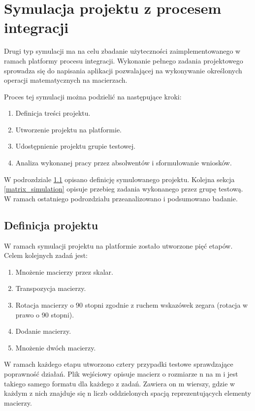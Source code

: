 \section{Symulacja projektu z procesem integracji}
\label{research_matrix}

Drugi typ symulacji ma na celu zbadanie użyteczności zaimplementowanego w ramach platformy procesu integracji.
Wykonanie pełnego zadania projektowego sprowadza się do napisania aplikacji pozwalającej na wykonywanie określonych operacji matematycznych na macierzach.

Proces tej symulacji można podzielić na następujące kroki:
\begin{enumerate}
    \item Definicja treści projektu.
    \item Utworzenie projektu na platformie.
    \item Udostępnienie projektu grupie testowej.
    \item Analiza wykonanej pracy przez absolwentów i sformułowanie wniosków.
\end{enumerate}

W podrozdziale \ref{matrix_project_definition} opisano definicję symulowanego projektu.
Kolejna sekcja \ref{matrix_simulation} opisuje przebieg zadania wykonanego przez grupę testową.
W ramach ostatniego podrozdziału przeanalizowano i podsumowano badanie.


\subsection{Definicja projektu}
\label{matrix_project_definition}

W ramach symulacji projektu na platformie zostało utworzone pięć etapów.
Celem kolejnych zadań jest:
\begin{enumerate}
    \item Mnożenie macierzy przez skalar.
    \item Transpozycja macierzy.
    \item Rotacja macierzy o 90 stopni zgodnie z ruchem wskazówek zegara (rotacja w prawo o 90 stopni).
    \item Dodanie macierzy.
    \item Mnożenie dwóch macierzy.
\end{enumerate}

W ramach każdego etapu utworzono cztery przypadki testowe sprawdzające poprawność działań.
Plik wejściowy opisuje macierz o rozmiarze n na m i jest takiego samego formatu dla każdego z zadań.
Zawiera on m wierszy, gdzie w każdym z nich znajduje się n liczb oddzielonych spacją reprezentujących elementy macierzy.

